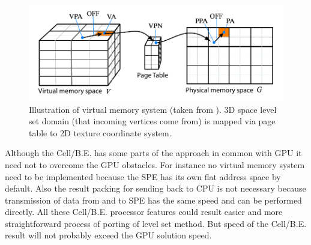 \begin{figure}
    \centering
    \includegraphics[width=\textwidth]{data/png/gpuVirtMemory}
    \caption[GPU virtual memory]{Illustration of virtual memory system (taken from \cite{lefonhGPUSolver}). 3D space level set domain (that incoming vertices come from) is mapped via page table to 2D texture coordinate system.}
    \label{fg:virtual memory on GPU}
\end{figure}

\par
Although the \mbox{Cell/B.E.} has some parts of the approach in common with GPU it need not to overcome the GPU obstacles.
For instance no virtual memory system need to be implemented because the SPE has its own flat address space by default.
Also the result packing for sending back to CPU is not necessary because transmission of data from and to SPE has the same speed and can be performed directly.
All these \mbox{Cell/B.E.} processor features could result easier and more straightforward process of porting of level set method.
But speed of the \mbox{Cell/B.E.} result will not probably exceed the GPU solution speed.
